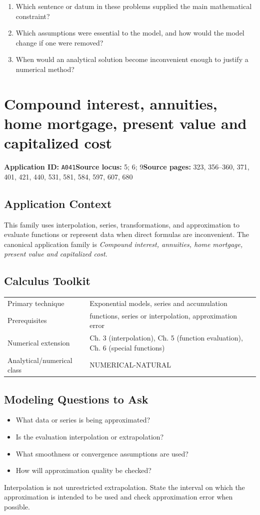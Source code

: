 \documentclass[11pt]{book}
\newcommand{\pid}[1]{\texttt{#1}}
\begin{document}
\begin{reflectionbox}\begin{enumerate}
\item Which sentence or datum in these problems supplied the main mathematical constraint?
\item Which assumptions were essential to the model, and how would the model change if one were removed?
\item When would an analytical solution become inconvenient enough to justify a numerical method?
\end{enumerate}\end{reflectionbox}
\chapter{Compound interest, annuities, home mortgage, present value and capitalized cost}\label{app:A041}
\textbf{Application ID:} \pid{A041}\quad \textbf{Source locus:} 5; 6; 9\quad \textbf{Source pages:} 323, 356–360, 371, 401, 421, 440, 531, 581, 584, 597, 607, 680
\section*{Application Context}
This family uses interpolation, series, transformations, and approximation to evaluate functions or represent data when direct formulas are inconvenient. The canonical application family is \emph{Compound interest, annuities, home mortgage, present value and capitalized cost}.
\section*{Calculus Toolkit}
\begin{tabularx}{\textwidth}{@{}lX@{}}\toprule
Primary technique & Exponential models, series and accumulation \\
Prerequisites & functions, series or interpolation, approximation error \\
Numerical extension & Ch. 3 (interpolation), Ch. 5 (function evaluation), Ch. 6 (special functions) \\
Analytical/numerical class & NUMERICAL-NATURAL \\
\bottomrule\end{tabularx}
\section*{Modeling Questions to Ask}\begin{itemize}
\item What data or series is being approximated?
\item Is the evaluation interpolation or extrapolation?
\item What smoothness or convergence assumptions are used?
\item How will approximation quality be checked?
\end{itemize}
\begin{errorbox}Interpolation is not unrestricted extrapolation. State the interval on which the approximation is intended to be used and check approximation error when possible.\end{errorbox}
\end{document}
